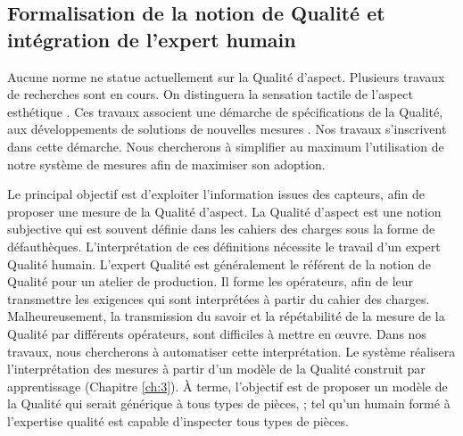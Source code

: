 \subsection{Formalisation de la notion de Qualité et intégration de l'expert humain}
Aucune norme ne statue actuellement sur la Qualité d'aspect.
Plusieurs travaux de recherches sont en cours.
On distinguera la sensation tactile \cite{bruno_albert_formalisation_2016, albert_generic_2016, albert_smart_2017, albert_smart_2019, albert_maitrise_2019} de l'aspect esthétique \cite{desage_syntactic_2015}.
Ces travaux associent une démarche de spécifications de la Qualité, aux développements de solutions de nouvelles mesures \cite{desage_constraints_2015, pitard_metrologie_2016, lacombe_exploitation_2018a}.
Nos travaux s'inscrivent dans cette démarche.
Nous chercherons à simplifier au maximum l'utilisation de notre système de mesures afin de maximiser son adoption.

Le principal objectif est d'exploiter l'information issues des capteurs, afin de proposer une mesure de la Qualité d'aspect.
La Qualité d'aspect est une notion subjective qui est souvent définie dans les cahiers des charges sous la forme de défauthèques.
L'interprétation de ces définitions nécessite le travail d'un expert Qualité humain.
L'expert Qualité est généralement le référent de la notion de Qualité pour un atelier de production.
Il forme les opérateurs, afin de leur transmettre les exigences qui sont interprétées à partir du cahier des charges.
Malheureusement, la transmission du savoir et la répétabilité de la mesure de la Qualité par différents opérateurs, sont difficiles à mettre en œuvre.
Dans nos travaux, nous chercherons à automatiser cette interprétation.
Le système réalisera l'interprétation des mesures à partir d'un modèle de la Qualité construit par apprentissage (Chapitre \ref{ch:3}).
À terme, l'objectif est de proposer un modèle de la Qualité qui serait générique à tous types de pièces, ; tel qu'un humain formé à l'expertise qualité est capable d'inspecter tous types de pièces.

